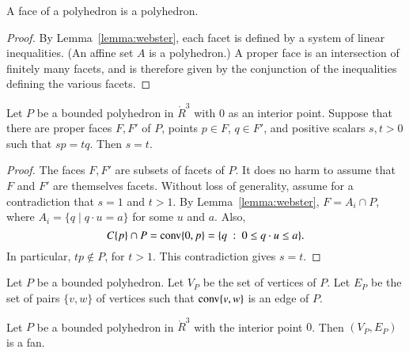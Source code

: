 \begin{corollary}
A face of a polyhedron is a polyhedron.  
\end{corollary}

\begin{proof} By Lemma~\ref{lemma:webster}, each facet is defined by a system of linear inequalities.  (An affine set $A$ is a polyhedron.)  A proper face is an intersection of finitely many facets, and is therefore given by the conjunction of the inequalities defining the various facets.
\end{proof}


\begin{lemma} \label{lemma:scale} 
Let $P$ be a bounded polyhedron in $\ring{R}^3$ with $0$ as an interior point.  Suppose that there are proper faces $F,F'$ of $P$, points $p\in F$, $q\in F'$, and positive scalars $s,t >0$ such that $s p = t q$.  Then $s=t$.
\end{lemma}

\begin{proof}  The faces $F,F'$ are subsets of facets of $P$.  It does no harm to assume that $F$ and $F'$ are themselves facets.   Without loss of generality, assume for a contradiction that $s=1$ and $t>1$.  By Lemma~\ref{lemma:webster}, 
 $F = A_i \cap P$, where $A_i = \{q \mid q\cdot u = a\}$ for some $u$ and $a$.  Also, 
$$
C\{p\}\cap P = {\operatorname{conv}}\{0,p\} = \{q \ :\  0\le q\cdot u \le a\}.
$$
In particular, $t p\not\in P$, for $t>1$.  This contradiction gives $s = t$.
\end{proof}





\begin{definition} Let $P$ be a bounded polyhedron.
Let $V_P$ be the set of vertices of $P$.  Let $E_P$ be the set of pairs $\{v,w\}$ of vertices such that ${\operatorname{conv}}\{v,w\}$ is an edge of $P$.
\end{definition}

\begin{lemma}\label{lemma:polyhedron}%
Let $P$ be a bounded polyhedron in $\ring{R}^3$ with the interior point $0$.
Then $(V_P,E_P)$ is a fan.
\end{lemma}

